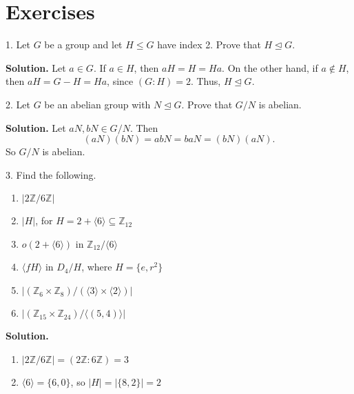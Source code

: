 \documentclass[10pt,]{book}
\theoremstyle{plain}
\theoremstyle{definition}
\theoremstyle{definition}
\theoremstyle{definition}
\theoremstyle{definition}
\numberwithin{equation}{section}
\def\Z{\mathbb{Z}}
\begin{document}
\section[{Exercises}]{Exercises}\label{exercises-9}
\begin{exerciselist}
\item[1.]\hypertarget{exercise-59}{}Let \(G\) be a group and let \(H\leq G\) have index 2. Prove that \(H\unlhd G\).%
\par\smallskip
\par\smallskip
\noindent\textbf{Solution.}\hypertarget{solution-59}{}\quad
Let \(a\in G\). If \(a\in H\), then \(aH=H=Ha\). On the other hand, if \(a\not\in H\), then \(aH=G-H=Ha\), since \((G:H)=2\). Thus, \(H\unlhd G\).%
\item[2.]\hypertarget{exercise-60}{}Let \(G\) be an abelian group with \(N\unlhd G\). Prove that \(G/N\) is abelian.%
\par\smallskip
\par\smallskip
\noindent\textbf{Solution.}\hypertarget{solution-60}{}\quad
Let \(aN,bN\in G/N.\) Then%
\begin{equation*}
(aN)(bN)=abN=baN=(bN)(aN).
\end{equation*}
So \(G/N\) is abelian.%
\item[3.]\hypertarget{exercise-61}{}Find the following. \leavevmode%
\begin{enumerate}[label=(\alph*)]
\item\hypertarget{li-504}{}\(|2\Z/6\Z|\)%
\item\hypertarget{li-505}{}\(|H|\), for \(H=2+\langle 6\rangle \subseteq \Z_{12}\)%
\item\hypertarget{li-506}{}\(o(2+\langle 6\rangle)\) in \(\Z_{12}/\langle 6\rangle\)%
\item\hypertarget{li-507}{}\(\langle fH\rangle \) in \(D_4/H\), where \(H=\{e,r^2\}\)%
\item\hypertarget{li-508}{}\(|(\Z_6\times \Z_8)/(\langle 3\rangle\times \langle 2\rangle)|\)%
\item\hypertarget{li-509}{}\(|(\Z_{15} \times \Z_{24})/\langle (5,4)\rangle|\)%
\end{enumerate}
%
\par\smallskip
\par\smallskip
\noindent\textbf{Solution.}\hypertarget{solution-61}{}\quad
\leavevmode%
\begin{enumerate}[label=(\alph*)]
\item\hypertarget{li-510}{}\(|2\Z/6\Z|=(2\Z:6\Z)=3\)%
\item\hypertarget{li-511}{}\(\langle 6\rangle=\{6,0\}\), so \(|H|=|\{8,2\}|=2\)%

\end{enumerate}
\end{exerciselist}
\end{document}
